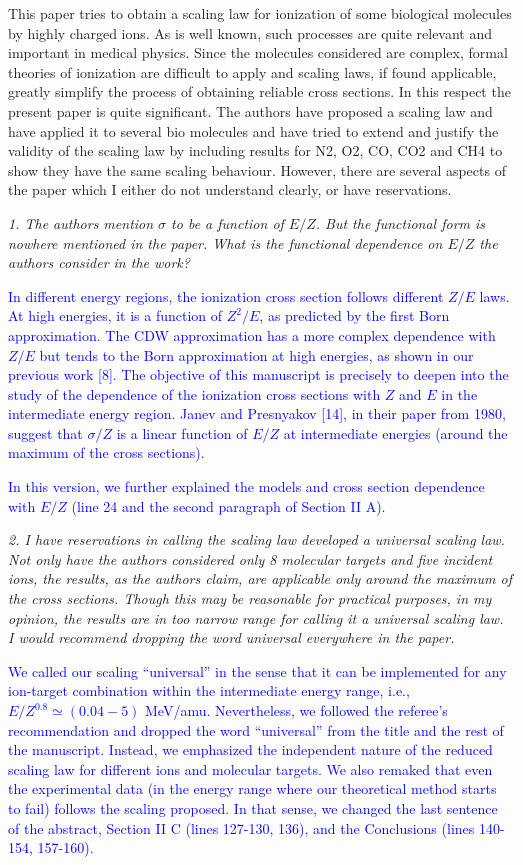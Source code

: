 \documentclass[a4paper,12pt]{article}
\def\reviewer#1{\vspace{0.35cm}\textsl{#1}}
\def\reply#1{\vspace{0.1cm}\textcolor{blue}{#1}}
\begin{document}
This paper tries to obtain a scaling law for ionization of some 
biological molecules by highly charged ions. As is well known, such
processes are quite relevant and important in medical physics. Since 
the molecules considered are complex, formal theories of ionization are
difficult to apply and scaling laws, if found applicable, greatly 
simplify the process of obtaining reliable cross sections. In this
respect the present paper is quite significant. The authors have
proposed a scaling law and have applied it to several bio molecules 
and have tried to extend and justify the validity of the scaling law 
by including results for N2, O2, CO, CO2 and CH4 to show they have the
same scaling behaviour. However, there are several aspects of the paper
which I either do not understand clearly, or have reservations.

\reviewer{1. The authors mention $\sigma$ to be a function of $E/Z$. 
But the functional form is nowhere mentioned in the paper. What is the
functional dependence on $E/Z$ the authors consider in the work?}

\reply{In different energy regions, the ionization cross section 
follows different $Z/E$ laws. At high energies, it is a function of 
$Z^2/E$, as predicted by the first Born approximation. The CDW 
approximation has a more complex dependence with $Z/E$ but tends to the
Born approximation at high energies, as shown in our previous work [8]. 
The objective of this manuscript is precisely to deepen into the study 
of the dependence of the ionization cross sections with $Z$ and $E$ in 
the intermediate energy region. Janev and Presnyakov [14], in their 
paper from 1980, suggest that $\sigma/Z$ is a linear function of $E/Z$ 
at intermediate energies (around the maximum of the cross sections).} 

\reply{In this version, we further explained the models and cross 
section dependence with $E/Z$ (line 24 and the second paragraph of 
Section II A).}

\reviewer{2. I have reservations in calling the scaling law developed 
a universal scaling law. Not only have the authors considered only 8
molecular targets and five incident ions, the results, as the authors
claim, are applicable only around the maximum of the cross sections. 
Though this may be reasonable for practical purposes, in my opinion, 
the results are in too narrow range for calling it a universal scaling
law. I would recommend dropping the word universal everywhere in the
paper.}

\reply{We called our scaling ``universal'' in the sense that it can be
implemented for any ion-target combination within the intermediate 
energy range, i.e., $E/Z^{0.8} \simeq (0.04-5)$ MeV/amu. Nevertheless, 
we followed the referee's recommendation and dropped the word 
``universal'' from the title and the rest of the manuscript. Instead, 
we emphasized the independent nature of the reduced scaling law for 
different ions and molecular targets. We also remaked that even 
the experimental data (in the energy range where our theoretical method
starts to fail) follows the scaling proposed. In that sense, we changed
the last sentence of the abstract, Section II C (lines 127-130, 136),
and the Conclusions (lines 140-154, 157-160).}
\end{document}
